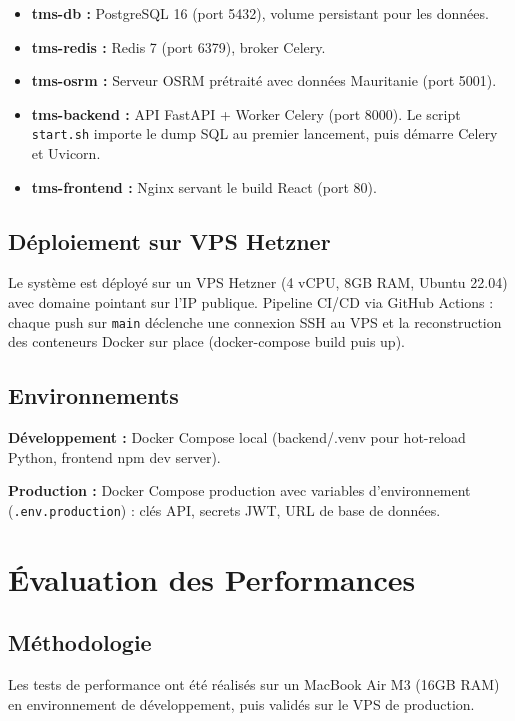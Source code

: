 \documentclass[12pt,a4paper]{report}
\begin{document}
\begin{itemize}[leftmargin=2.2em]
    \item \textbf{tms-db :} PostgreSQL 16 (port 5432), volume persistant pour les données.
    \item \textbf{tms-redis :} Redis 7 (port 6379), broker Celery.
    \item \textbf{tms-osrm :} Serveur OSRM prétraité avec données Mauritanie (port 5001).
    \item \textbf{tms-backend :} API FastAPI + Worker Celery (port 8000). Le script \texttt{start.sh} importe le dump SQL au premier lancement, puis démarre Celery et Uvicorn.
    \item \textbf{tms-frontend :} Nginx servant le build React (port 80).
\end{itemize}

\subsection{Déploiement sur VPS Hetzner}

Le système est déployé sur un VPS Hetzner (4 vCPU, 8GB RAM, Ubuntu 22.04) avec domaine pointant sur l'IP publique. Pipeline CI/CD via GitHub Actions : chaque push sur \texttt{main} déclenche une connexion SSH au VPS et la reconstruction des conteneurs Docker sur place (docker-compose build puis up).

\subsection{Environnements}

\textbf{Développement :} Docker Compose local (backend/.venv pour hot-reload Python, frontend npm dev server).

\textbf{Production :} Docker Compose production avec variables d'environnement (\texttt{.env.production}) : clés API, secrets JWT, URL de base de données.

\section{Évaluation des Performances}

\subsection{Méthodologie}

Les tests de performance ont été réalisés sur un MacBook Air M3 (16GB RAM) en environnement de développement, puis validés sur le VPS de production. 
\end{document}
